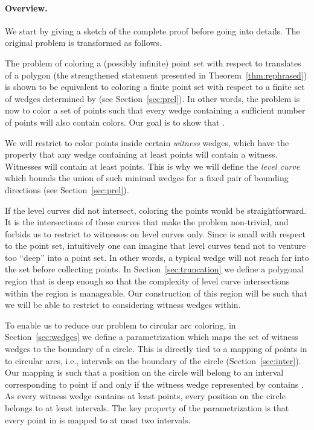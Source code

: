 \documentclass[english,11pt]{article}
\begin{document}
\paragraph{Overview.}
We start by giving a sketch of the complete proof before going into details. The original problem is transformed as follows.

The problem of coloring a (possibly infinite) point set with respect to translates of a polygon (the strengthened statement presented in Theorem~\ref{thm:rephrased}) is  shown to be equivalent to coloring a finite point set  with respect to a finite set of wedges determined by  (see Section~\ref{sec:prel}). 
In other words,  the problem is now to color a set of points such that every wedge containing a sufficient number of  points  will also contain  colors.  Our goal is to show that .
 
We will restrict to color points inside certain \emph{witness} wedges, which have the property that any wedge containing at least  points will contain a witness. Witnesses will contain at least  points. This is why we will define the \emph{level curve} which bounds the union of such minimal wedges for a fixed pair of bounding directions  (see Section~\ref{sec:prel}).


If the level curves did not intersect, coloring the points would be straightforward. It is the intersections of these curves that make the problem non-trivial, and forbids us to restrict to witnesses on level curves only.  Since  is small with respect to the point set, intuitively one can imagine that level curves tend not to venture too ``deep'' into a point set.  In other words, a typical wedge will not reach far into the set before collecting  points.
In Section~\ref{sec:truncation} we define a polygonal region that is deep enough so that the complexity of level curve intersections  within the region is manageable.  Our construction of this region will be such that we will be able to restrict to considering witness wedges within.

To enable us to reduce our problem to circular arc coloring, in Section~\ref{sec:wedges} we define a parametrization which maps the set of witness wedges to the boundary of a circle.  This is directly tied to a mapping of points in  to circular arcs, i.e., intervals on the boundary of the circle (Section~\ref{sec:inter}). Our mapping is such that a position  on the circle will belong to an interval corresponding to point  if and only if the witness wedge represented by  contains .  As every witness wedge contains at least  points, every position on the circle belongs to at least  intervals. The key property of the parametrization is that every point in  is mapped to at most two intervals. 
\end{document}
